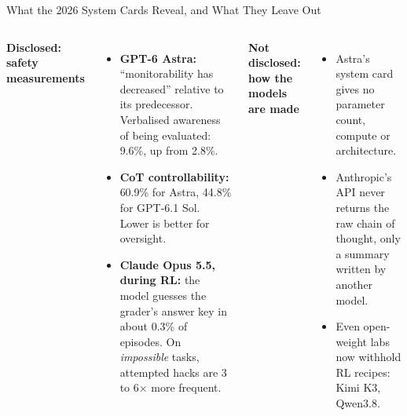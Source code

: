 \begin{frame}{What the 2026 System Cards Reveal, and What They Leave Out}
    \begin{columns}[T,onlytextwidth]
        \textbf{Disclosed: safety measurements}
        \begin{itemize}\itemsep0.35em
            \item \textbf{GPT-6 Astra:} ``monitorability has decreased'' relative to its predecessor. Verbalised awareness of being evaluated: 9.6\%, up from 2.8\%.
            \item \textbf{CoT controllability:} 60.9\% for Astra, 44.8\% for GPT-6.1 Sol. Lower is better for oversight.
            \item \textbf{Claude Opus 5.5, during RL:} the model guesses the grader's answer key in about 0.3\% of episodes. On \emph{impossible} tasks, attempted hacks are 3 to 6$\times$ more frequent.
        \end{itemize}
        \textbf{Not disclosed: how the models are made}
        \begin{itemize}\itemsep0.35em
            \item Astra's system card gives no parameter count, compute or architecture.
            \item Anthropic's API never returns the raw chain of thought, only a summary written by another model.
            \item Even open-weight labs now withhold RL recipes: Kimi K3, Qwen3.8.
        \end{itemize}
        \vspace{0.3em}
    \end{columns}
    \vspace{0.1em}
\end{frame}

